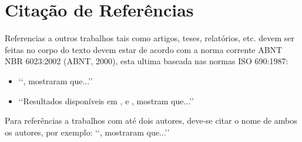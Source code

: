 \section{Citação de Referências}

Referencias a outros trabalhos tais como artigos, teses, relatórios, etc. devem
ser feitas no corpo do texto devem estar de acordo com a norma corrente ABNT
NBR 6023:2002 (ABNT, 2000), esta ultima baseada nas normas ISO 690:1987:
\begin{itemize}
	\item \lq\lq {}, mostraram que...\rq\rq

	\item \lq\lq Resultados disponíveis em \cite{coimbra1978}, \cite{clark1986}
	e \cite{sparrow1980}, mostram que...\rq\rq
\end{itemize}

Para referências a trabalhos com até dois autores, deve-se citar o nome de
ambos os autores, por exemplo: \lq\lq {}, mostraram
que...\rq\rq
